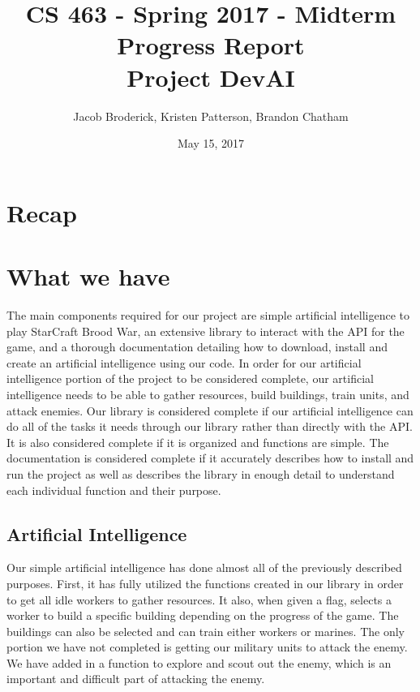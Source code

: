\documentclass[10pt,letterpaper,onecolumn,draftclsnofoot]{IEEEtran}
\begin{document}
	
	\begin{titlepage}
		
		\title{CS 463 - Spring 2017 - Midterm Progress Report \\ Project DevAI}
		\author{Jacob Broderick, Kristen Patterson, Brandon Chatham}
		\date{May 15, 2017}
		\maketitle
		\vspace{4cm}
	\end{titlepage}

\section{Recap}


\section{What we have}
The main components required for our project are simple artificial intelligence to play StarCraft Brood War, an extensive library to interact with the API for the game, and a thorough documentation detailing how to download, install and create an artificial intelligence using our code. In order for our artificial intelligence portion of the project to be considered complete, our artificial intelligence needs to be able to gather resources, build buildings, train units, and attack enemies. Our library is considered complete if our artificial intelligence can do all of the tasks it needs through our library rather than directly with the API. It is also considered complete if it is organized and functions are simple. The documentation is considered complete if it accurately describes how to install and run the project as well as describes the library in enough detail to understand each individual function and their purpose.
\subsection{Artificial Intelligence}
Our simple artificial intelligence has done almost all of the previously described purposes. First, it has fully utilized the functions created in our library in order to get all idle workers to gather resources. It also, when given a flag, selects a worker to build a specific building depending on the progress of the game. The buildings can also be selected and can train either workers or marines. The only portion we have not completed is getting our military units to attack the enemy. We have added in a function to explore and scout out the enemy, which is an important and difficult part of attacking the enemy.
\end{document}
